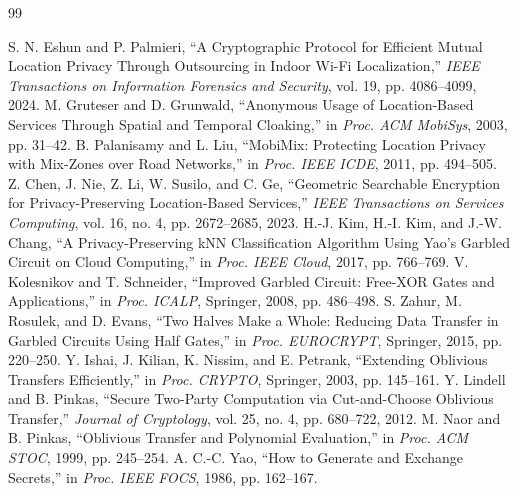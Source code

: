 \documentclass[12pt,a4paper,oneside]{report}
\begin{document}
\newpage
\begin{thebibliography}{99}

 S. N. Eshun and P. Palmieri, ``A Cryptographic Protocol for Efficient Mutual Location Privacy Through Outsourcing in Indoor Wi-Fi Localization,'' \textit{IEEE Transactions on Information Forensics and Security}, vol. 19, pp. 4086--4099, 2024.
 M. Gruteser and D. Grunwald, ``Anonymous Usage of Location-Based Services Through Spatial and Temporal Cloaking,'' in \textit{Proc. ACM MobiSys}, 2003, pp. 31--42.
 B. Palanisamy and L. Liu, ``MobiMix: Protecting Location Privacy with Mix-Zones over Road Networks,'' in \textit{Proc. IEEE ICDE}, 2011, pp. 494--505.
 Z. Chen, J. Nie, Z. Li, W. Susilo, and C. Ge, ``Geometric Searchable Encryption for Privacy-Preserving Location-Based Services,'' \textit{IEEE Transactions on Services Computing}, vol. 16, no. 4, pp. 2672--2685, 2023.
 H.-J. Kim, H.-I. Kim, and J.-W. Chang, ``A Privacy-Preserving kNN Classification Algorithm Using Yao's Garbled Circuit on Cloud Computing,'' in \textit{Proc. IEEE Cloud}, 2017, pp. 766--769.
 V. Kolesnikov and T. Schneider, ``Improved Garbled Circuit: Free-XOR Gates and Applications,'' in \textit{Proc. ICALP}, Springer, 2008, pp. 486--498.
 S. Zahur, M. Rosulek, and D. Evans, ``Two Halves Make a Whole: Reducing Data Transfer in Garbled Circuits Using Half Gates,'' in \textit{Proc. EUROCRYPT}, Springer, 2015, pp. 220--250.
 Y. Ishai, J. Kilian, K. Nissim, and E. Petrank, ``Extending Oblivious Transfers Efficiently,'' in \textit{Proc. CRYPTO}, Springer, 2003, pp. 145--161.
 Y. Lindell and B. Pinkas, ``Secure Two-Party Computation via Cut-and-Choose Oblivious Transfer,'' \textit{Journal of Cryptology}, vol. 25, no. 4, pp. 680--722, 2012.
 M. Naor and B. Pinkas, ``Oblivious Transfer and Polynomial Evaluation,'' in \textit{Proc. ACM STOC}, 1999, pp. 245--254.
 A. C.-C. Yao, ``How to Generate and Exchange Secrets,'' in \textit{Proc. IEEE FOCS}, 1986, pp. 162--167.

\end{thebibliography}
\end{document}

